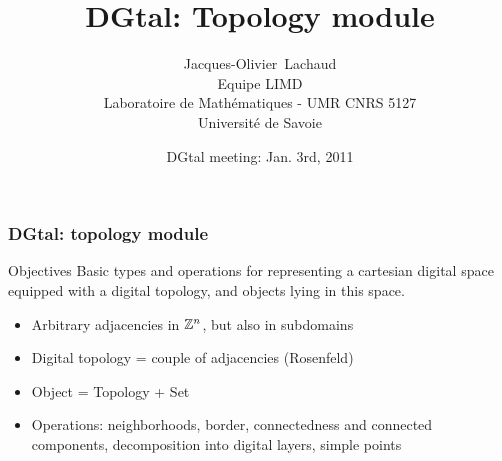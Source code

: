 \documentclass[pdftex,francais]{beamer}
\title{DGtal: Topology module}
\author[J.-O. Lachaud]{Jacques-Olivier~Lachaud\\[3mm]
  \small
  Equipe LIMD\\
  Laboratoire de Math\'{e}matiques - UMR CNRS 5127\\
  Universit\'{e} de Savoie
  \normalsize
}
\date{DGtal meeting: Jan. 3rd, 2011}
\begin{document}
\newlength{\unquart}
\setlength{\unquart}{0.21\textwidth}

\begin{frame}
  \titlepage
\end{frame}

\begin{frame}
  \frametitle{DGtal: topology module}
  
  \begin{block}{Objectives}
    Basic types and operations for representing a cartesian digital
    space equipped with a digital topology, and objects lying in this
    space.
  \end{block}

  \begin{itemize}
  \item Arbitrary adjacencies in $\mathbb{Z}^n$, but also in subdomains
  \item Digital topology = couple of adjacencies (Rosenfeld)
  \item Object = Topology + Set
  \item Operations: neighborhoods, border, connectedness and connected
    components, decomposition into digital layers, simple points
  \end{itemize}

\end{frame}
\end{document}
